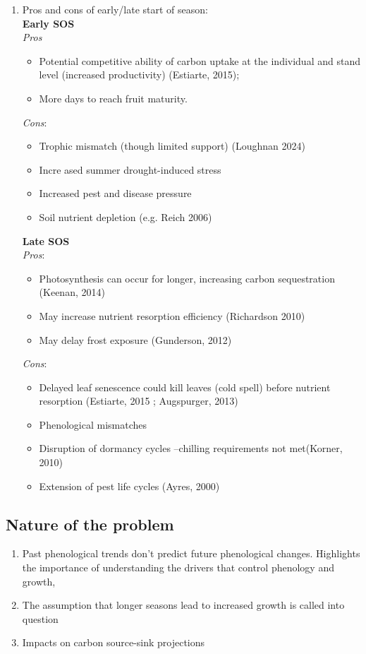 \documentclass{article}
\begin{document}
\begin{enumerate}
	\item Pros and cons of early/late start of season: \\  %
		\textbf{Early SOS}\\
		\textit{Pros} 
			\begin {itemize}
				\item Potential competitive ability of carbon uptake at the individual and stand level (increased productivity) (Estiarte, 2015); 
				\item More days to reach fruit maturity. 
			\end {itemize}
		\textit{Cons}: 
			\begin {itemize}
				\item Trophic mismatch (though limited support) (Loughnan 2024)
				\item Incre	ased summer drought-induced stress
				\item Increased pest and disease pressure
				\item Soil nutrient depletion (e.g. Reich 2006)
			\end {itemize}
		\textbf{Late SOS} \\
		\textit{Pros}: 
			\begin {itemize}
				\item Photosynthesis can occur for longer, increasing carbon sequestration (Keenan, 2014) 
				\item May increase nutrient resorption efficiency (Richardson 2010)
				\item May delay frost exposure (Gunderson, 2012)
			\end {itemize}
		\textit{Cons}: 
			\begin {itemize}
				\item Delayed leaf senescence could kill leaves (cold spell) before nutrient resorption (Estiarte, 2015 ; Augspurger, 2013)
				\item Phenological mismatches
				\item Disruption of dormancy cycles --chilling requirements not met(Korner, 2010)
				\item Extension of pest life cycles (Ayres, 2000)
			\end {itemize}
\end{enumerate}

\subsection{Nature of the problem} 
\begin{enumerate}
	\item Past phenological trends don't predict future phenological changes. Highlights the importance of understanding the drivers that control phenology and growth,
	\item The assumption that longer seasons lead to increased growth is called into question
	\item Impacts on carbon source-sink projections
\end{enumerate}
\end{document}
